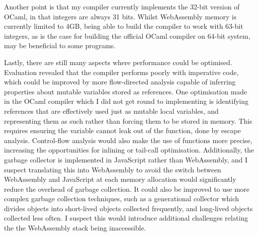Another point is that my compiler currently implements the 32-bit version of OCaml, in that integers are always 31 bits. 
Whilst WebAssembly memory is currently limited to 4GB, being able to build the compiler to work with 63-bit integers, as is the case for building the official OCaml compiler on 64-bit system, may be beneficial to some programs.

Lastly, there are still many aspects where performance could be optimised. Evaluation revealed that the compiler performs poorly with imperative code, which could be improved by more flow-directed analysis capable of inferring properties about mutable variables stored as references.
One optimisation made in the OCaml compiler which I did not get round to implementing is identifying references that are effectively used just as mutable local variables, and representing them as such rather than forcing them to be stored in memory.
This requires ensuring the variable cannot leak out of the function, done by escape analysis. Control-flow analysis would also make the use of functions more precise, increasing the opportunities for inlining or tail-call optimisation.
Additionally, the garbage collector is implemented in JavaScript rather than WebAssembly, and I suspect translating this into WebAssembly to avoid the switch between WebAssembly and JavaScript at each memory allocation would significantly reduce the overhead of garbage collection.
It could also be improved to use more complex garbage collection techniques, such as a generational collector which divides objects into short-lived objects collected frequently, and long-lived objects collected less often. I suspect this would introduce additional challenges relating the the WebAssembly stack being inaccessible.



